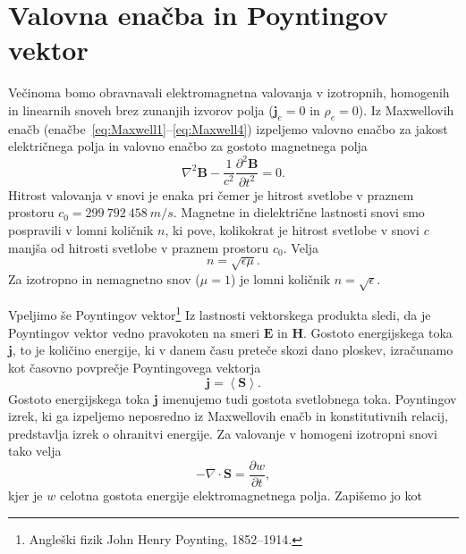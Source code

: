 \section{Valovna enačba in Poyntingov vektor}
Večinoma bomo obravnavali elektromagnetna valovanja v izotropnih, 
homogenih in linearnih snoveh brez zunanjih izvorov polja ($\mathbf{j}_e=0$ in $\rho_{e}=0$). 
Iz Maxwellovih enačb (enačbe~\ref{eq:Maxwell1}--\ref{eq:Maxwell4}) izpeljemo valovno
enačbo za jakost električnega polja
in valovno enačbo za gostoto magnetnega polja 
\begin{equation}
\label{eq:valovna-skalarna-B}
\nabla^{2}\mathbf{B}-\frac{1}{c^{2}}\frac{\partial^{2}\mathbf{B}}{\partial t^{2}} = 0.
\end{equation}
Hitrost valovanja v snovi je enaka 
pri čemer je hitrost svetlobe v praznem prostoru $c_0 = 299~792~458~\si{m/s}$. 
Magnetne in dielektrične lastnosti snovi smo pospravili
v lomni količnik $n$, ki pove, kolikokrat je hitrost 
svetlobe v snovi $c$ manjša od hitrosti svetlobe v praznem prostoru $c_0$. Velja
\begin{equation}
n=\sqrt{\epsilon\mu}.
\end{equation}
Za izotropno in nemagnetno snov ($\mu=1$) je lomni količnik $n=\sqrt{\epsilon}$.

Vpeljimo še Poyntingov 
vektor\footnote{Angleški fizik John Henry Poynting, 1852--1914.} 
Iz lastnosti vektorskega produkta sledi, da je Poyntingov vektor vedno pravokoten na 
smeri $\mathbf{E}$ in $\mathbf{H}$. Gostoto energijskega toka $\mathbf{j}$, to je količino
energije, ki v danem času preteče skozi dano ploskev, izračunamo kot časovno 
povprečje Poyntingovega vektorja 
\begin{equation}
\mathbf{j}=\left\langle \mathbf{\mathbf{S}}\right\rangle.
\label{eq:jscal}
\end{equation}
Gostoto energijskega toka $\mathbf{j}$ imenujemo tudi gostota svetlobnega 
toka.
Poyntingov izrek, ki ga izpeljemo neposredno 
iz Maxwellovih enačb in konstitutivnih relacij, predstavlja izrek o ohranitvi 
energije. Za valovanje v homogeni izotropni snovi tako velja
\begin{equation}
-\nabla\cdot\mathbf{S}=\frac{\partial w}{\partial t},
\end{equation}
kjer je $w$ celotna
gostota energije elektromagnetnega polja. Zapišemo jo kot 

